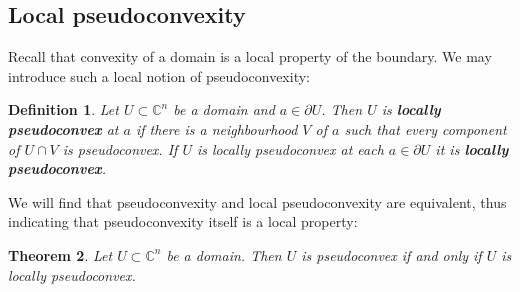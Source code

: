\documentclass[11pt,a4paper, final, twoside]{article}
\newtheorem{theorem}{Theorem}
\newtheorem{definition}[theorem]{Definition}
\numberwithin{equation}{section}
\newcommand{\C}{\mathbb C}
\newcommand{\bd}{\partial}
\begin{document}
\subsection{Local pseudoconvexity}
Recall that convexity of a domain is a local property of the boundary. We may introduce such a local notion of pseudoconvexity:
\begin{definition}
Let $U\subset\C^n$ be a domain and $a\in\bd U$. Then $U$ is \textbf{locally pseudoconvex} at $a$ if there is a neighbourhood $V$ of $a$
such that every component of $U\cap V$ is pseudoconvex. If $U$ is locally pseudoconvex at each $a\in\bd U$ it is 
\textbf{locally pseudoconvex}.
\end{definition}
We will find that pseudoconvexity and local pseudoconvexity are equivalent, thus indicating that pseudoconvexity itself is a local property:
\begin{theorem}
\label{pslocal}
Let $U\subset\C^n$ be a domain. Then $U$ is pseudoconvex if and only if $U$ is locally pseudoconvex.
\end{theorem}
\end{document}
